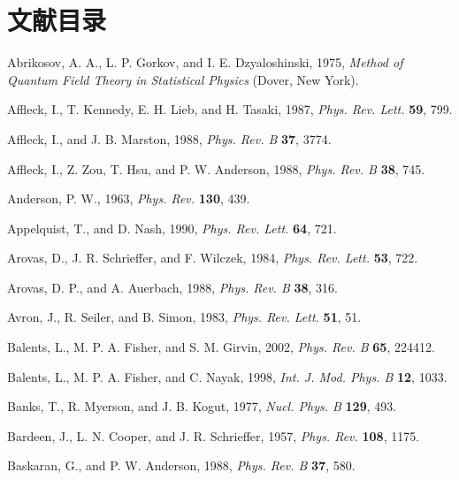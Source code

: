 \chapter*{文献目录}

\begin{list}{}{\setlength{\leftmargin}{2em}\setlength{\itemindent}{-2em}}

\item Abrikosov, A. A., L. P. Gorkov, and I. E. Dzyaloshinski, 1975, \emph{Method of Quantum Field Theory in Statistical Physics} (Dover, New York).
\item Affleck, I., T. Kennedy, E. H. Lieb, and H. Tasaki, 1987, \emph{Phys. Rev. Lett.} \textbf{59}, 799.
\item Affleck, I., and J. B. Marston, 1988, \emph{Phys. Rev. B} \textbf{37}, 3774.
\item Affleck, I., Z. Zou, T. Hsu, and P. W. Anderson, 1988, \emph{Phys. Rev. B} \textbf{38}, 745.
\item Anderson, P. W., 1963, \emph{Phys. Rev.} \textbf{130}, 439.
\item Appelquist, T., and D. Nash, 1990, \emph{Phys. Rev. Lett.} \textbf{64}, 721.
\item Arovas, D., J. R. Schrieffer, and F. Wilczek, 1984, \emph{Phys. Rev. Lett.} \textbf{53}, 722.
\item Arovas, D. P., and A. Auerbach, 1988, \emph{Phys. Rev. B} \textbf{38}, 316.
\item Avron, J., R. Seiler, and B. Simon, 1983, \emph{Phys. Rev. Lett.} \textbf{51}, 51.
\item Balents, L., M. P. A. Fisher, and S. M. Girvin, 2002, \emph{Phys. Rev. B} \textbf{65}, 224412.
\item Balents, L., M. P. A. Fisher, and C. Nayak, 1998, \emph{Int. J. Mod. Phys. B} \textbf{12}, 1033.
\item Banks, T., R. Myerson, and J. B. Kogut, 1977, \emph{Nucl. Phys. B} \textbf{129}, 493.
\item Bardeen, J., L. N. Cooper, and J. R. Schrieffer, 1957, \emph{Phys. Rev.} \textbf{108}, 1175.
\item Baskaran, G., and P. W. Anderson, 1988, \emph{Phys. Rev. B} \textbf{37}, 580.

\end{list}
